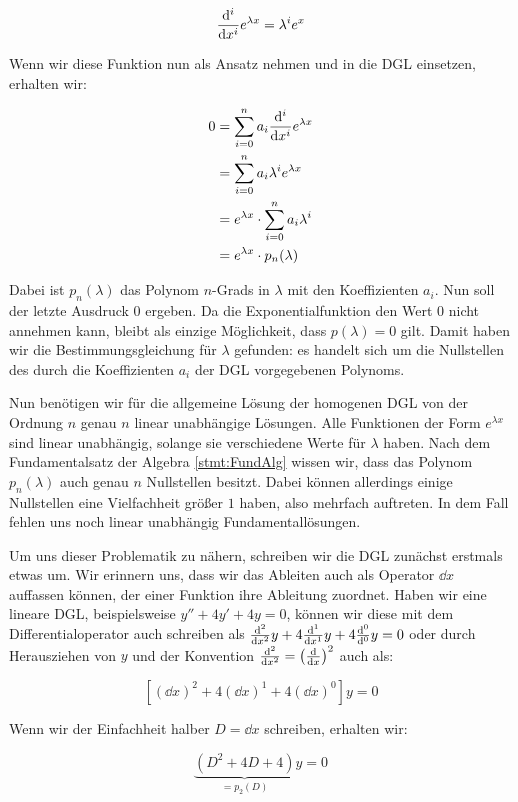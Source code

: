 $$
    \frac{\mathrm{d}^{i}{}}{\mathrm{d}{x^{i}}} e^{\lambda x} = \lambda^i e^x
$$

Wenn wir diese Funktion nun als Ansatz nehmen und in die DGL einsetzen, erhalten wir:

\begin{alignat*}{1}
    0 &= \sum\limits_{i=0}^n a_i \frac{\mathrm{d}^{i}{}}{\mathrm{d}{x^{i}}} e^{\lambda x} \\
      &= \sum\limits_{i=0}^n a_i \lambda^i e^{\lambda x} \\
      &= e^{\lambda x} \cdot \sum\limits_{i=0}^n a_i \lambda^i \\
      &= e^{\lambda x} \cdot p_n(\lambda)
\end{alignat*}

Dabei ist $p_n(\lambda)$ das Polynom $n$-Grads in $\lambda$ mit den Koeffizienten $a_i$. Nun soll der letzte Ausdruck $0$ ergeben. Da die Exponentialfunktion den Wert $0$ nicht annehmen kann, bleibt als einzige Möglichkeit, dass $p(\lambda) = 0$ gilt. Damit haben wir die Bestimmungsgleichung für $\lambda$ gefunden: es handelt sich um die Nullstellen des durch die Koeffizienten $a_i$ der DGL vorgegebenen Polynoms.

Nun benötigen wir für die allgemeine Lösung der homogenen DGL von der Ordnung $n$ genau $n$ linear unabhängige Lösungen. Alle Funktionen der Form $e^{\lambda x}$ sind linear unabhängig, solange sie verschiedene Werte für $\lambda$ haben. Nach dem Fundamentalsatz der Algebra \ref{stmt:FundAlg} wissen wir, dass das Polynom $p_n(\lambda)$ auch genau $n$ Nullstellen besitzt. Dabei können allerdings einige Nullstellen eine Vielfachheit größer $1$ haben, also mehrfach auftreten. In dem Fall fehlen uns noch linear unabhängig Fundamentallösungen.

Um uns dieser Problematik zu nähern, schreiben wir die DGL zunächst erstmals etwas um. Wir erinnern uns, dass wir das Ableiten auch als Operator $\dd{}{x}$ auffassen können, der einer Funktion ihre Ableitung zuordnet. Haben wir eine lineare DGL, beispielsweise $y''+4y'+4y=0$, können wir diese mit dem Differentialoperator auch schreiben als $\frac{\mathrm{d}^{2}{}}{\mathrm{d}{x^{2}}} y + 4\frac{\mathrm{d}^{1}{}}{\mathrm{d}{x^{1}}} y + 4\frac{\mathrm{d}^{0}{}}{\mathrm{d}{^{0}}} y = 0$ oder durch Herausziehen von $y$ und der Konvention $\frac{\mathrm{d}^{2}{}}{\mathrm{d}{x^{2}}} = \left(\frac{\mathrm{d}{}}{\mathrm{d}{x}}\right)^2$ auch als:

$$
    \left[ \left(\dd{}{x}\right)^2 + 4 \left(\dd{}{x}\right)^1 + 4 \left(\dd{}{x}\right)^0 \right] y = 0
$$

Wenn wir der Einfachheit halber $D=\dd{}{x}$  schreiben, erhalten wir:

$$
    \underbrace{(D^2+4D+4)}_{=p_2(D)} y = 0
$$

